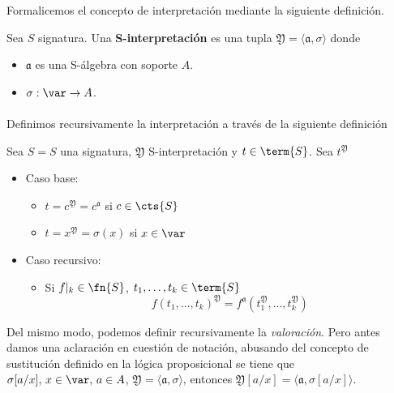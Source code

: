Formalicemos el concepto de interpretación mediante la siguiente definición. 
\begin{definition}
Sea $S$ signatura. Una \textbf{S-interpretación} es una tupla $\mathfrak{Y} = \langle \mathfrak{a}, \sigma \rangle$ donde
\begin{itemize}
    \item $\mathfrak{a}$ es una S-álgebra con soporte $A$.
    \item $\sigma : \var \rightarrow A$.
\end{itemize}
\end{definition}
\paragraph{}
Definimos recursivamente la interpretación a través de la siguiente definición
\begin{definition}
Sea $S = \si{S}$ una signatura, $\mathfrak{Y}$ S-interpretación y $t \in \term{S}$.  Sea $t^{\mathfrak{Y}}$
\begin{itemize}
    \item Caso base:
    \begin{itemize}
    	\item $t=c^{\mathfrak{Y}} = c^{\mathfrak{a}}$ si $c \in \cts{S}$
        \item $t=x^{\mathfrak{Y}} = \sigma(x)$ si $x \in \var$
    \end{itemize}
    \item Caso recursivo:
    \begin{itemize}
        \item Si $f\vert_k \in \fn{S}$, $t_1, \dots, t_k \in \term{S}$
        \[ f(t_1, \dots, t_k)^{\mathfrak{Y}} = f^{\mathfrak{a}}(t_{1}^{\mathfrak{Y}}, \dots, t_{k}^{\mathfrak{Y}}) \] 
    \end{itemize}
\end{itemize}
\end{definition}
Del mismo modo, podemos definir recursivamente la \textit{valoración}. Pero antes damos una aclaración en cuestión de notación, abusando del concepto de sustitución definido en la lógica proposicional se tiene que $\sigma[a/x], \, x \in \var, \, a \in A$, $\mathfrak{Y}= \langle \mathfrak{a}, \sigma \rangle$, entonces  $\mathfrak{Y}[a/x]= \langle \mathfrak{a},\sigma[a/x]\rangle$. 
